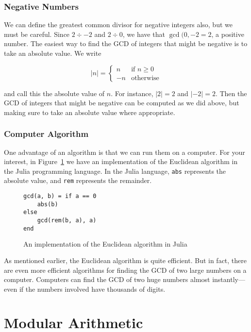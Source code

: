 \documentclass[a4paper,10pt]{report}
\begin{document}
\subsection{Negative Numbers}

We can define the greatest common divisor for negative integers also, but we
must be careful. Since \(2 \div -2\) and \(2 \div 0\), we have that \(\gcd(0,
-2 = 2\), a positive number. The easiest way to find the GCD of integers that
might be negative is to take an absolute value. We write

\begin{equation}
  |n| = \begin{cases}
    n & \text{if }n\ge 0 \\
    -n & \text{otherwise}
  \end{cases}
\end{equation}

and call this the absolute value of \(n\). For instance, \(|2| = 2\) and \(|-2| =
2\). Then the GCD of integers that might be negative can be computed as we did
above, but making sure to take an absolute value where appropriate.

\subsection{Computer Algorithm}

One advantage of an algorithm is that we can run them on a computer. For your
interest, in Figure~\ref{gcd:julia} we have an \gls{implementation} of the
Euclidean algorithm in the Julia \gls{programming language}. In the Julia
language, \verb|abs| represents the absolute value, and \verb|rem| represents
the remainder.

\begin{figure}
  \begin{verbatim}
gcd(a, b) = if a == 0
    abs(b)
else
    gcd(rem(b, a), a)
end
  \end{verbatim}
  \caption{An implementation of the Euclidean algorithm in Julia}

  \label{gcd:julia}
\end{figure}

As mentioned earlier, the Euclidean algorithm is quite efficient. But in fact,
there are even more efficient algorithms for finding the GCD of two large
numbers on a computer. Computers can find the GCD of two huge numbers almost
instantly---even if the numbers involved have thousands of digits.

\chapter{Modular Arithmetic}
\end{document}
